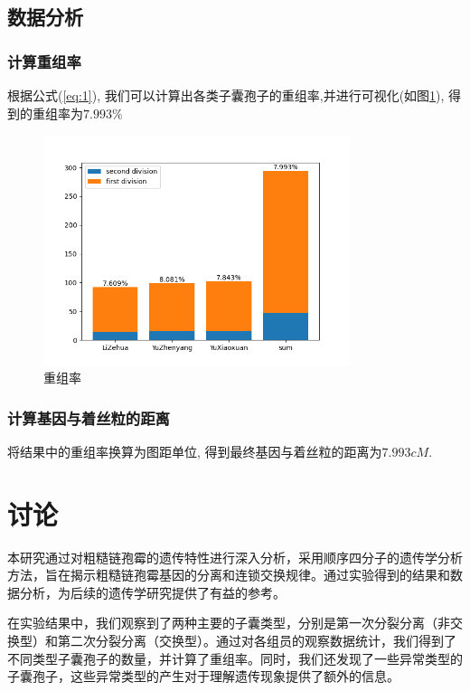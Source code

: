 \documentclass[]{LZUThesis}
\begin{document}
\section{数据分析}
\subsection{计算重组率}
根据公式(\ref{eq:1}), 我们可以计算出各类子囊孢子的重组率,并进行可视化(如图\ref{fig:python}), 
得到的重组率为$7.993\%$

\begin{figure}[htbp]
    \centering
    \includegraphics[width=0.8\textwidth]{img/python_result}
    \caption{重组率}
    \label{fig:python}
\end{figure}



\subsection{计算基因与着丝粒的距离}

将结果中的重组率换算为图距单位, 得到最终基因与着丝粒的距离为$7.993cM$.

\chapter{讨论}

本研究通过对粗糙链孢霉的遗传特性进行深入分析，采用顺序四分子的遗传学分析方法，旨在揭示粗糙链孢霉基因的分离和连锁交换规律。通过实验得到的结果和数据分析，为后续的遗传学研究提供了有益的参考。

在实验结果中，我们观察到了两种主要的子囊类型，分别是第一次分裂分离（非交换型）和第二次分裂分离（交换型）。通过对各组员的观察数据统计，我们得到了不同类型子囊孢子的数量，并计算了重组率。同时，我们还发现了一些异常类型的子囊孢子，这些异常类型的产生对于理解遗传现象提供了额外的信息。
\end{document}
